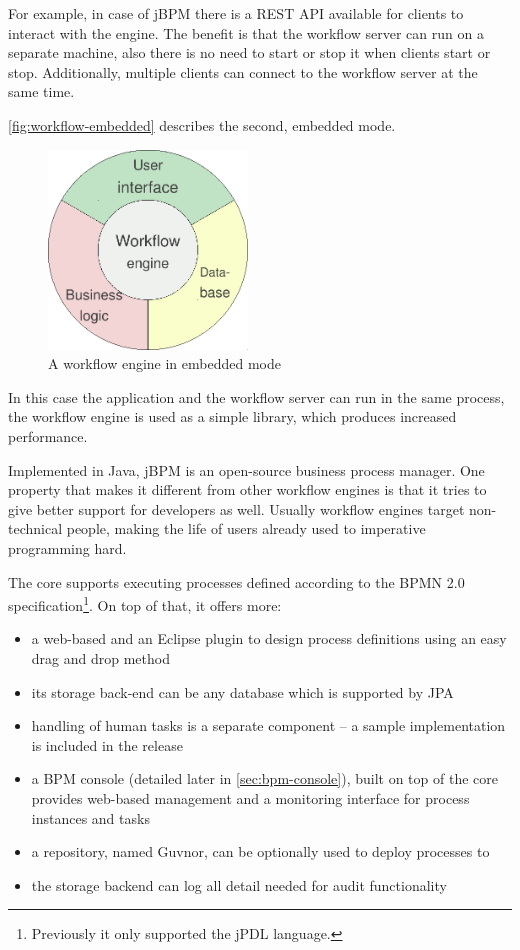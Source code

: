 For example, in case of jBPM there is a REST API available for clients to
interact with the engine. The benefit is that the workflow server can run on a
separate machine, also there is no need to start or stop it when clients start or stop.
Additionally, multiple clients can connect to the workflow server at the same
time.

\autoref{fig:workflow-embedded} describes the second, embedded mode.

\begin{figure}[H]
\centering
\includegraphics[width=200px,keepaspectratio]{workflow-embedded.pdf}
\caption{A workflow engine in embedded mode}
\label{fig:workflow-embedded}
\end{figure}

In this case the application and the workflow server can run in the same
process, the workflow engine is used as a simple library, which produces
increased performance.


Implemented in Java, jBPM \cite{jbpm} is an open-source business process
manager. One property that makes it different from other workflow engines is
that it tries to give better support for developers as well. Usually workflow
engines target non-technical people, making the life of users already used to
imperative programming hard.

The core supports executing processes defined according to the BPMN 2.0
specification\footnote{Previously it only supported the jPDL language.}. On top of that, it offers more:

\begin{itemize}
\item a web-based and an Eclipse plugin to design process definitions using an easy drag and drop method
\item its storage back-end can be any database which is supported by JPA\cite{jpa}
\item handling of human tasks is a separate component -- a sample implementation is included in the release
\item a BPM console (detailed later in \autoref{sec:bpm-console}), built
on top of the core provides web-based management and a monitoring interface for
process instances and tasks
\item a repository, named Guvnor, can be optionally used to deploy processes to
\item the storage backend can log all detail needed for audit functionality
\end{itemize}

